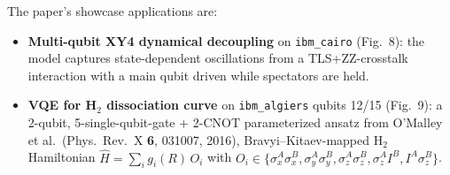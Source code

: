 \documentclass[11pt]{article}
\begin{document}
The paper's showcase applications are:
\begin{itemize}
  \item \textbf{Multi-qubit XY4 dynamical decoupling} on \texttt{ibm\_cairo} (Fig.~8): the model captures state-dependent oscillations from a TLS+ZZ-crosstalk interaction with a main qubit driven while spectators are held.
  \item \textbf{VQE for H$_2$ dissociation curve} on \texttt{ibm\_algiers} qubits 12/15 (Fig.~9): a 2-qubit, 5-single-qubit-gate + 2-CNOT parameterized ansatz from O'Malley et al.\ (Phys.\ Rev.\ X \textbf{6}, 031007, 2016), Bravyi--Kitaev-mapped H$_2$ Hamiltonian $\hat H = \sum_i g_i(R)\, O_i$ with $O_i \in \{\sigma^A_x\sigma^B_x, \sigma^A_y\sigma^B_y, \sigma^A_z\sigma^B_z, \sigma^A_z I^B, I^A\sigma^B_z\}$.
\end{itemize}
\end{document}
